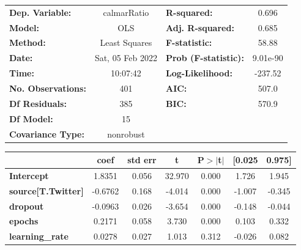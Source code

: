 \begin{center}
\begin{tabular}{lclc}
\toprule
\textbf{Dep. Variable:}              &   calmarRatio    & \textbf{  R-squared:         } &     0.696   \\
\textbf{Model:}                      &       OLS        & \textbf{  Adj. R-squared:    } &     0.685   \\
\textbf{Method:}                     &  Least Squares   & \textbf{  F-statistic:       } &     58.88   \\
\textbf{Date:}                       & Sat, 05 Feb 2022 & \textbf{  Prob (F-statistic):} &  9.01e-90   \\
\textbf{Time:}                       &     10:07:42     & \textbf{  Log-Likelihood:    } &   -237.52   \\
\textbf{No. Observations:}           &         401      & \textbf{  AIC:               } &     507.0   \\
\textbf{Df Residuals:}               &         385      & \textbf{  BIC:               } &     570.9   \\
\textbf{Df Model:}                   &          15      & \textbf{                     } &             \\
\textbf{Covariance Type:}            &    nonrobust     & \textbf{                     } &             \\
\bottomrule
\end{tabular}
\begin{tabular}{lcccccc}
                                     & \textbf{coef} & \textbf{std err} & \textbf{t} & \textbf{P$> |$t$|$} & \textbf{[0.025} & \textbf{0.975]}  \\
\midrule
\textbf{Intercept}                   &       1.8351  &        0.056     &    32.970  &         0.000        &        1.726    &        1.945     \\
\textbf{source[T.Twitter]}           &      -0.6762  &        0.168     &    -4.014  &         0.000        &       -1.007    &       -0.345     \\
\textbf{dropout}                     &      -0.0963  &        0.026     &    -3.654  &         0.000        &       -0.148    &       -0.044     \\
\textbf{epochs}                      &       0.2171  &        0.058     &     3.730  &         0.000        &        0.103    &        0.332     \\
\textbf{learning\_rate}              &       0.0278  &        0.027     &     1.013  &         0.312        &       -0.026    &        0.082     \\

\end{tabular}
\end{center}
